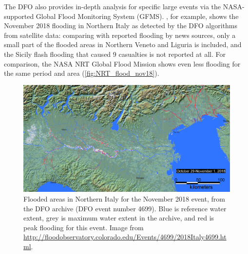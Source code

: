 The DFO also provides in-depth analysis for specific large events via the NASA-supported Global Flood Monitoring System (GFMS). , for example, shows the November 2018 flooding in Northern Italy as detected by the DFO algorithms from satellite data: comparing with reported flooding by news sources, only a small part of the flooded areas in Northern Veneto and Liguria is included, and the Sicily flash flooding that caused 9 casualties is not reported at all. For comparison, the NASA NRT Global Flood Mission \citep{Nigro2014} shows even less flooding for the same period and area (\cref{fig:NRT_flood_nov18}).
\begin{figure}
    \centering
    \includegraphics[width=\textwidth]{figures/ita_flood/2018Italy4699}
    \decoRule
    \caption[Flooded area in the November 2018 Italian flood]{
        Flooded areas in Northern Italy for the November 2018 event, from the DFO archive (DFO event number 4699). Blue is reference water extent, grey is maximum water extent in the archive, and red is peak flooding for this event. Image from \url{http://floodobservatory.colorado.edu/Events/4699/2018Italy4699.html}.
} \label{fig:DFO_flood_nov18}
\end{figure}

